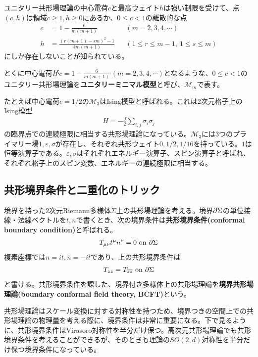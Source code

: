 ユニタリー共形場理論の中心電荷$c$と最高ウェイト$h$は強い制限を受けて、点$(c,h)$は領域$c\geq 1,h\geq 0$にあるか、$0\leq c<1$の離散的な点
\begin{align}
c&=1-\frac{6}{m(m+1)}&&(m=2,3,4,\cdots)\\
h&=\frac{(r(m+1)-sm)^2-1}{4m(m+1)}&&(1\leq r\leq m-1,\ 1\leq s\leq m)
\end{align}
にしか存在しないことが知られている。

とくに中心電荷が$c=1-\frac{6}{m(m+1)}\ (m=2,3,4,\cdots)$となるような、$0\leq c <1$のユニタリー共形場理論を\textbf{ユニタリーミニマル模型}と呼び、$\mathcal{M}_m$で表す。

たとえば中心電荷$c=1/2$の$\mathcal{M}_3$はIsing模型と呼ばれる。これは2次元格子上のIsing模型
\begin{align}
H=-\frac{J}{2}\sum_{i,j} \sigma_i \sigma_j
\end{align}
の臨界点での連続極限に相当する共形場理論になっている。$\mathcal{M}_3$には3つのプライマリー場$1,\varepsilon,\sigma$が存在し、それぞれ共形ウェイト$0,1/2,1/16$を持っている。$1$は恒等演算子である。$\varepsilon,\sigma$はそれぞれエネルギー演算子、スピン演算子と呼ばれ、それぞれ格子上のスピン変数、エネルギーの連続極限に相当する。

\subsection{共形境界条件と二重化のトリック}\label{subsecdoubling}
\begin{oframed}
境界を持った$2$次元Riemann多様体$\Sigma$上の共形場理論を考える。境界$\partial\Sigma$の単位接線・法線ベクトルを$t,n$で書くとき、次の境界条件は\textbf{共形境界条件(conformal boundary condition)}と呼ばれる\cite{Cardy:1989ir}。
\begin{align}
T_{\mu\nu} t^\mu n^\nu =0\text{  on }\partial \Sigma
\end{align}
複素座標では$n=it,\overline{n}=-i\overline{t}$であり、上の共形境界条件は
\begin{align}
T_{zz}=T_{\overline{z}\overline{z}}\text{  on }\partial \Sigma
\end{align}
と書ける。共形境界条件を課した、境界付き多様体上の共形場理論を\textbf{境界共形場理論(boundary conformal field theory, BCFT)}という。
\end{oframed}

共形場理論はスケール変換に対する対称性を持つため、境界つきの空間上での共形場理論の物理量を考える際に、境界条件は非常に重要になる。下で見るように、共形境界条件はVirasoro対称性を半分だけ保つ。高次元共形場理論でも共形境界条件を考えることができるが、そのときも理論の$SO(2,d)$対称性を半分だけ保つ境界条件になっている。


